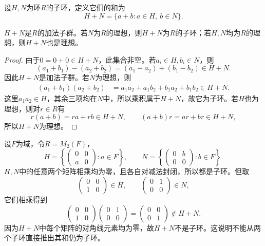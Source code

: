 \begin{definition}\label{p2:concept:c3-subring-sum}
设$H,N$为环$R$的子环，定义它们的和为
\[
H+N=\{a+b:a\in H,\ b\in N\}.
\]
\end{definition}
\begin{proposition}
	$H+N $是$R$的加法子群。若$N$为$R$的理想，则$H+N$为$R$的子环；若$H,N$均为$R$的理想，则$H+N$也是理想。
\end{proposition}
\begin{proof}
	由于$0=0+0\in H+N$，此集合非空。若$a_i\in H,b_i\in N$，则
\[
(a_1+b_1)-(a_2+b_2)=(a_1-a_2)+(b_1-b_2)\in H+N.
\]
因此$H+N$是加法子群。若$N$为理想，则
	\begin{align*}
		(a_1+b_1)(a_2+b_2)
		&=a_1a_2+a_1b_2+b_1a_2+b_1b_2\in H+N.
	\end{align*}
	这里$a_1a_2\in H$，其余三项均在$N$中，所以乘积属于$H+N$，故它为子环。若$H$也为理想，则对$r\in R$有
	\[
	r(a+b)=ra+rb\in H+N,\qquad (a+b)r=ar+br\in H+N,
	\]
	所以$H+N$为理想。
\end{proof}
\begin{example}
设$F$为域，令$R=M_2(F)$，
\[
H=\left\{\begin{pmatrix}0&0\\a&0\end{pmatrix}:a\in F\right\},\qquad
N=\left\{\begin{pmatrix}0&b\\0&0\end{pmatrix}:b\in F\right\}.
\]
$H,N$中的任意两个矩阵相乘均为零，且各自对减法封闭，所以都是子环。但取
\[
\begin{pmatrix}0&0\\1&0\end{pmatrix}\in H,\qquad
\begin{pmatrix}0&1\\0&0\end{pmatrix}\in N,
\]
它们相乘得到
\[
\begin{pmatrix}0&0\\1&0\end{pmatrix}
\begin{pmatrix}0&1\\0&0\end{pmatrix}
=\begin{pmatrix}0&0\\0&1\end{pmatrix}\notin H+N.
\]
因为$H+N$中每个矩阵的对角线元素均为零，故$H+N$不是子环。这说明不能从两个子环直接推出其和仍为子环。
\end{example}

